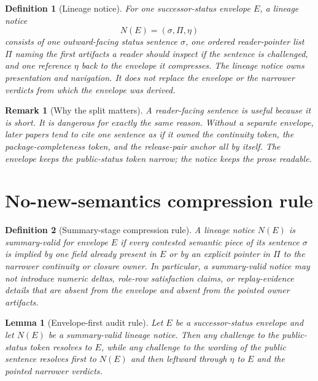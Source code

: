\documentclass[11pt]{article}
\newtheorem{definition}{Definition}
\newtheorem{lemma}{Lemma}
\newtheorem{remark}{Remark}
\begin{document}
\begin{definition}[Lineage notice]
For one successor-status envelope $E$, a \emph{lineage notice}
\[
N(E)=(\sigma,\Pi,\eta)
\]
consists of one outward-facing status sentence $\sigma$, one ordered reader-pointer list $\Pi$ naming the first artifacts a reader should inspect if the sentence is challenged, and one reference $\eta$ back to the envelope it compresses.
The lineage notice owns presentation and navigation.
It does not replace the envelope or the narrower verdicts from which the envelope was derived.
\end{definition}

\begin{remark}[Why the split matters]
A reader-facing sentence is useful because it is short.
It is dangerous for exactly the same reason.
Without a separate envelope, later papers tend to cite one sentence as if it owned the continuity token, the package-completeness token, and the release-pair anchor all by itself.
The envelope keeps the public-status token narrow; the notice keeps the prose readable.
\end{remark}

\section{No-new-semantics compression rule}

\begin{definition}[Summary-stage compression rule]
A lineage notice $N(E)$ is \emph{summary-valid} for envelope $E$ if every contested semantic piece of its sentence $\sigma$ is implied by one field already present in $E$ or by an explicit pointer in $\Pi$ to the narrower continuity or closure owner.
In particular, a summary-valid notice may not introduce numeric deltas, role-row satisfaction claims, or replay-evidence details that are absent from the envelope and absent from the pointed owner artifacts.
\end{definition}

\begin{lemma}[Envelope-first audit rule]
Let $E$ be a successor-status envelope and let $N(E)$ be a summary-valid lineage notice.
Then any challenge to the public-status token resolves to $E$, while any challenge to the wording of the public sentence resolves first to $N(E)$ and then leftward through $\eta$ to $E$ and the pointed narrower verdicts.
\end{lemma}
\end{document}
